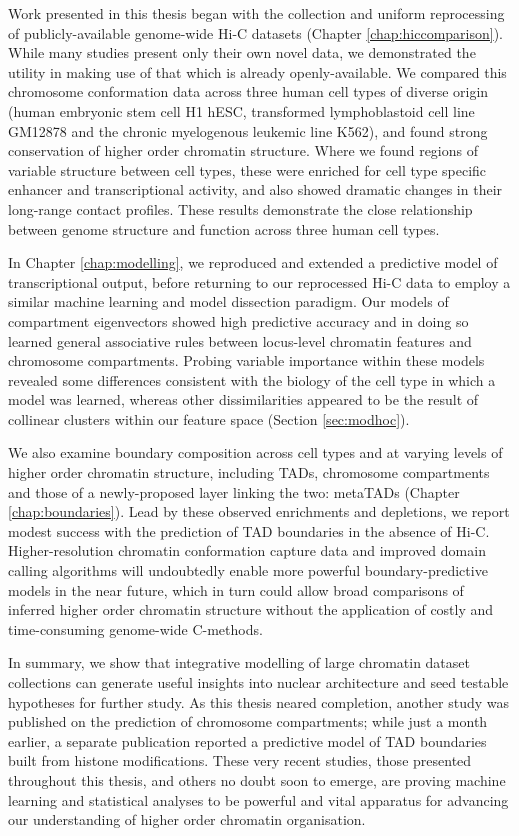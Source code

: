\documentclass[a4paper,11pt,oneside]{book}
\begin{document}
Work presented in this thesis began with the collection and uniform reprocessing of publicly-available genome-wide Hi-C datasets (Chapter \ref{chap:hiccomparison}). While many studies present only their own novel data, we demonstrated the utility in making use of that which is already openly-available. We compared this chromosome conformation data across three human cell types of diverse origin (human embryonic stem cell H1 hESC, transformed lymphoblastoid cell line GM12878 and the chronic myelogenous leukemic line K562), and found strong conservation of higher order chromatin structure. Where we found regions of variable structure between cell types, these were enriched for cell type specific enhancer and transcriptional activity, and also showed dramatic changes in their long-range contact profiles. These results demonstrate the close relationship between genome structure and function across three human cell types.
 
In Chapter \ref{chap:modelling}, we reproduced and extended a predictive model of transcriptional output, before returning to our reprocessed Hi-C data to employ a similar machine learning and model dissection paradigm.
Our models of compartment eigenvectors showed high predictive accuracy and in doing so learned general associative rules between locus-level chromatin features and chromosome compartments. Probing variable importance within these models revealed some differences consistent with the biology of the cell type in which a model was learned, whereas other dissimilarities appeared to be the result of collinear clusters within our feature space (Section \ref{sec:modhoc}).

We also examine boundary composition across cell types and at varying levels of higher order chromatin structure, including TADs, chromosome compartments and those of a newly-proposed layer linking the two: metaTADs (Chapter \ref{chap:boundaries}). Lead by these observed enrichments and depletions, we report modest success with the prediction of TAD boundaries in the absence of Hi-C. Higher-resolution chromatin conformation capture data and improved domain calling algorithms will undoubtedly enable more powerful boundary-predictive models in the near future, which in turn could allow broad comparisons of inferred higher order chromatin structure without the application of costly and time-consuming genome-wide C-methods.

In summary, we show that integrative modelling of large chromatin dataset
collections can generate useful insights into nuclear architecture and seed testable hypotheses for further study. As this thesis neared completion, another study was published on the prediction of chromosome compartments;\cite{Fortin2015} while just a month earlier, a separate publication reported a predictive model of TAD boundaries built from histone modifications.\cite{Huang2015} These very recent studies, those presented throughout this thesis, and others no doubt soon to emerge, are proving machine learning and statistical analyses to be powerful and vital apparatus for advancing our understanding of higher order chromatin organisation.

\ifstandalone
\begin{small}

\end{small}
\fi
\end{document}

